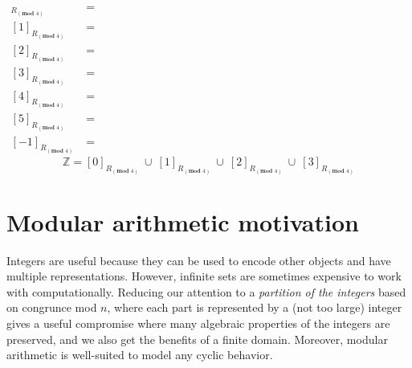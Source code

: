 \documentclass[12pt, oneside]{article}
\begin{document}
\begin{align*}
    [0]_{R_{(\textbf{mod } 4)}} &= \phantom{ \{ x \in \mathbb{Z} \mid x \equiv 0 ((\textbf{mod } 4)) \} 
    = \{ x \in \mathbb{Z} \mid x \textbf{ mod } 4 = 0 \textbf{ mod } 4 = 0 \} = \{ 4c \mid c \in \mathbb{Z}\} }\\
    [1]_{R_{(\textbf{mod } 4)}} &= \phantom{ \{ x \in \mathbb{Z} \mid x \equiv 1 ((\textbf{mod } 4)) \} 
    = \{ x \in \mathbb{Z} \mid x \textbf{ mod } 4 = 1 \textbf{ mod } 4 = 1 \} = \{ 4c+1 \mid c \in \mathbb{Z}\} }\\
    [2]_{R_{(\textbf{mod } 4)}} &= \phantom{ \{ x \in \mathbb{Z} \mid x \equiv 2 ((\textbf{mod } 4)) \} 
    = \{ x \in \mathbb{Z} \mid x \textbf{ mod } 4 = 2 \textbf{ mod } 4 = 0 \} = \{ 4c+2 \mid c \in \mathbb{Z}\} }\\
    [3]_{R_{(\textbf{mod } 4)}} &= \phantom{ \{ x \in \mathbb{Z} \mid x \equiv 3 ((\textbf{mod } 4)) \} 
    = \{ x \in \mathbb{Z} \mid x \textbf{ mod } 4 = 3 \textbf{ mod } 4 = 3 \} = \{ 4c+3 \mid c \in \mathbb{Z}\} }\\
    [4]_{R_{(\textbf{mod } 4)}} &= \phantom{ \{ x \in \mathbb{Z} \mid x \equiv 4 ((\textbf{mod } 4)) \} 
    = \{ x \in \mathbb{Z} \mid x \textbf{ mod } 4 = 4 \textbf{ mod } 4 = 0 \} = \{ 4c \mid c \in \mathbb{Z}\} }\\
    [5]_{R_{(\textbf{mod } 4)}} &= \phantom{ \{ x \in \mathbb{Z} \mid x \equiv 5 ((\textbf{mod } 4)) \} 
    = \{ x \in \mathbb{Z} \mid x \textbf{ mod } 4 = 5 \textbf{ mod } 4 = 1 \} = \{ 4c+1 \mid c \in \mathbb{Z}\} }\\
    [-1]_{R_{(\textbf{mod } 4)}} &= \phantom{ \{ x \in \mathbb{Z} \mid x \equiv -1 ((\textbf{mod } 4)) \} 
    = \{ x \in \mathbb{Z} \mid x \textbf{ mod } 4 = -1 \textbf{ mod } 4 = 3 \} = \{ 4c+3 \mid c \in \mathbb{Z}\} }
\end{align*}
\[
\mathbb{Z} =  [0]_{R_{(\textbf{mod } 4)}}~ \cup ~[1]_{R_{(\textbf{mod } 4)}} ~\cup~[2]_{R_{(\textbf{mod } 4)}}~\cup~
[3]_{R_{(\textbf{mod } 4)}}
\]





 \vfill
\section*{Modular arithmetic motivation}


Integers are useful because they can be used to encode other objects
and have multiple representations. However, infinite sets are sometimes
expensive to work with computationally. Reducing our attention to 
a {\it partition of the integers} based on congrunce mod $n$, where
each part is represented by a (not too large) integer gives a useful 
compromise where many algebraic properties of the integers are preserved, 
and we also get the benefits of a finite domain. Moreover, modular arithmetic
is well-suited to model any cyclic behavior. \vfill
\end{document}
